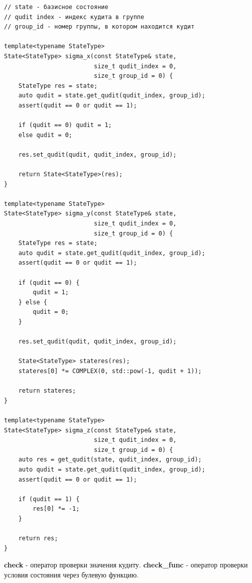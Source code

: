 \documentclass[12pt,fleqn]{article}
\begin{document}
\begin{mdframed}[linecolor=black, topline=true, bottomline=true,
leftline=false, rightline=false]
\begin{verbatim}
// state - базисное состояние
// qudit index - индекс кудита в группе
// group_id - номер группы, в котором находится кудит

template<typename StateType>
State<StateType> sigma_x(const StateType& state,
                         size_t qudit_index = 0,
                         size_t group_id = 0) {
    StateType res = state;
    auto qudit = state.get_qudit(qudit_index, group_id);
    assert(qudit == 0 or qudit == 1);

    if (qudit == 0) qudit = 1;
    else qudit = 0;

    res.set_qudit(qudit, qudit_index, group_id);

    return State<StateType>(res);
}

template<typename StateType>
State<StateType> sigma_y(const StateType& state,
                         size_t qudit_index = 0,
                         size_t group_id = 0) {
    StateType res = state;
    auto qudit = state.get_qudit(qudit_index, group_id);
    assert(qudit == 0 or qudit == 1);

    if (qudit == 0) { 
        qudit = 1;
    } else {
        qudit = 0;
    }

    res.set_qudit(qudit, qudit_index, group_id);

    State<StateType> stateres(res);
    stateres[0] *= COMPLEX(0, std::pow(-1, qudit + 1));

    return stateres;
}

template<typename StateType>
State<StateType> sigma_z(const StateType& state,
                         size_t qudit_index = 0,
                         size_t group_id = 0) {
    auto res = get_qudit(state, qudit_index, group_id);
    auto qudit = state.get_qudit(qudit_index, group_id);
    assert(qudit == 0 or qudit == 1);

    if (qudit == 1) {
        res[0] *= -1;
    }

    return res;
}
\end{verbatim}
\end{mdframed}

        \begin{center}
            \textbf{check} - оператор проверки значения кудиту. \newline
            \textbf{check\_func} - оператор проверки условия состояния через булевую функцию.
        \end{center}
\end{document}
